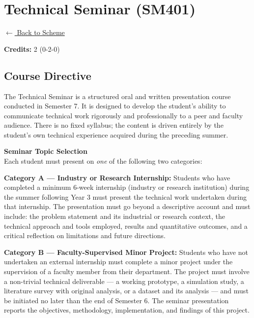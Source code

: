 \section*{Technical Seminar (SM401)}
\label{course:SM401}

\noindent \small{\hyperref[main:scheme]{$\leftarrow$ Back to Scheme}} \vspace{0.5cm}

\noindent \textbf{Credits:} 2 (0-2-0)

\subsection*{Course Directive}
\noindent The Technical Seminar is a structured oral and written presentation course conducted in Semester 7. It is designed to develop the student's ability to communicate technical work rigorously and professionally to a peer and faculty audience. There is no fixed syllabus; the content is driven entirely by the student's own technical experience acquired during the preceding summer.

\vspace{0.3cm}

\noindent\textbf{Seminar Topic Selection} \\
Each student must present on \textit{one} of the following two categories:

\vspace{0.2cm}

\noindent\textbf{Category A — Industry or Research Internship:} Students who have completed a minimum 6-week internship (industry or research institution) during the summer following Year 3 must present the technical work undertaken during that internship. The presentation must go beyond a descriptive account and must include: the problem statement and its industrial or research context, the technical approach and tools employed, results and quantitative outcomes, and a critical reflection on limitations and future directions.

\vspace{0.3cm}

\noindent\textbf{Category B — Faculty-Supervised Minor Project:} Students who have not undertaken an external internship must complete a minor project under the supervision of a faculty member from their department. The project must involve a non-trivial technical deliverable — a working prototype, a simulation study, a literature survey with original analysis, or a dataset and its analysis — and must be initiated no later than the end of Semester 6. The seminar presentation reports the objectives, methodology, implementation, and findings of this project.

\newpage
{}
